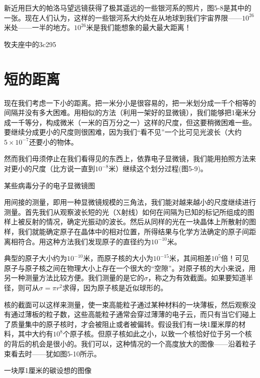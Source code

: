 \documentclass[12pt,oneside]{book}
\begin{document}
新近用巨大的帕洛马望远镜获得了极其遥远的一些银河系的照片，图5-8是其中的一张。现在人们认为，这样的一些银河系大约处在从地球到我们宇宙界限——$ 10^{26} $米处——一半的地方。$ 10^{26} $米是我们能想象的最大最大距离！
\begin{fig}[2.5]{牧夫座中的3c295}
\caption{\footnotesize 最现代化的200英寸望远镜拍摄的最远天体——牧夫座中的3C295（用箭头标出）}
\label{fig:牧夫座中的3c295}
\end{fig}


\section{短的距离}
现在我们考虑一下小的距离。把一米分小是很容易的，把一米划分成一千个相等的间隔并没有多大困难。用相似的方法（利用一架好的显微镜），我们能够把1毫米分成一千等分，构成微米（一米的百万分之一）这样的尺度，但这要稍微困难一些。要继续分成更小的尺度则很困难，因为我们“看不见”一个比可见光波长（大约$ 5\times 10^{-7} $还要小的物体。

然而我们毋须停止在我们看得见的东西上，依靠电子显微镜，我们能用拍照方法来对更小的尺度（比方说一直到$ 10^{-8} $米）继续这个划分过程(图5-9)。
\begin{fig}[2.5]{某些病毒分子的电子显微镜图}
\caption{\footnotesize 某些病毒分子的电子显微镜图。“大的”球是为定标用的，且已知其直径为$ 2\times 10^{-7} $米(2000 Å)}
\label{fig:某些病毒分子的电子显微镜图}
\end{fig}
用间接的测量，即用一种显微镜规模的三角法，我们能对越来越小的尺度继续进行测量。首先我们从观察波长短的光（X射线）如何在间隔为已知的标记所组成的图样上被反射的情况，确定光振动的波长。然后从同样的光在一块晶体上所散射的图样，我们就能确定原子在晶体中的相对位置，所得结果与化学方法确定的原子间距离相符合。用这种方法我们发现原子的直径约为$10^{-10}$米。

典型的原子大小约为$10^{-10}$米，而原子核的大小为$10^{-15}$米，其间相差$10^5$倍！可见原子与原子核之间在物理大小上存在一个很大的“空隙”。对原子核的大小来说，用另一种测量方法比较方便。我们测量的是它的$\sigma$，称之为有效截面。如果要知道半径，则可从$\sigma=\pi r^2$求得，因为原子核是近似球形的。

核的截面可以这样来测量，使一束高能粒子通过某种材料的一块薄板，然后观察没有通过薄板的粒子数，这些高能粒子通常会穿过薄薄的电子云，而只有当它们碰上了质量集中的原子核时，才会被阻止或者被偏转。假设我们有一块1厘米厚的材料，其中大约有$10^8$个原子核。但原子核如此之小，以致一个核恰好位于另一个核的背后的机会是很小的。我们可以，这种情况的一个高度放大的图像——沿着粒子束看去时——犹如图5-10所示。
\begin{fig}{一块厚1厘米的碳设想的图像}
\caption{\footnotesize 在只观察核的时候，通过一块厚1厘米的碳所见到的那个设想的图像}
\label{fig:一块厚1厘米的碳设想的图像}
\end{fig}
\end{document}
